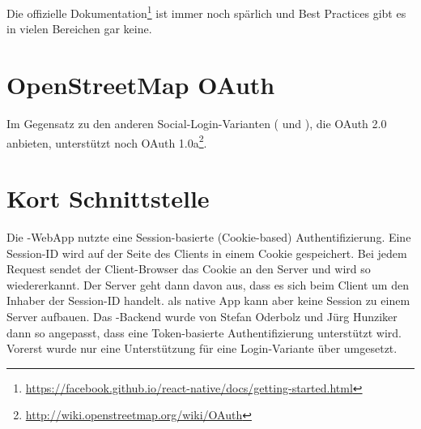Die offizielle Dokumentation\footnote{\url{https://facebook.github.io/react-native/docs/getting-started.html}} ist immer noch spärlich und Best Practices gibt es in vielen Bereichen gar keine.


\section{OpenStreetMap OAuth}
Im Gegensatz zu den anderen Social-Login-Varianten ( und ), die OAuth 2.0 anbieten, unterstützt  noch OAuth 1.0a\footnote{\url{http://wiki.openstreetmap.org/wiki/OAuth}}.


\section{Kort Schnittstelle}
Die \kort{}-\gls{WebApp} nutzte eine Session-basierte (Cookie-based) Authentifizierung.\cite{ba-kort-2012} 
Eine Session-ID wird auf der Seite des Clients in einem Cookie gespeichert. 
Bei jedem Request sendet der Client-Browser das Cookie an den Server und wird so wiedererkannt. 
Der Server geht dann davon aus, dass es sich beim Client um den Inhaber der Session-ID handelt. 
\kort{} als native App kann aber keine Session zu einem Server aufbauen.
Das \kort{}-Backend wurde von Stefan Oderbolz und Jürg Hunziker dann so angepasst, dass eine Token-basierte Authentifizierung unterstützt wird.
Vorerst wurde nur eine Unterstützung für eine Login-Variante über  umgesetzt.

